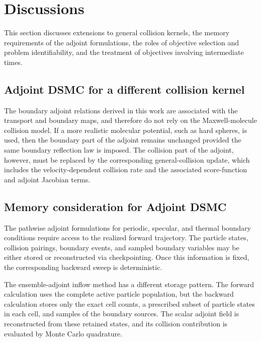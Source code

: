 \documentclass[12pt,nopreprintline]{elsarticle}
\begin{document}
{

\section{Discussions}\label{sec:discussion}

This section discusses extensions to general collision kernels, the memory requirements of the adjoint formulations, the roles of objective selection and problem identifiability, and the treatment of objectives involving intermediate times.

\subsection{Adjoint DSMC for a different collision kernel} The boundary adjoint relations derived in this work are associated with the transport and boundary maps, and therefore do not rely on the Maxwell-molecule collision model. If a more realistic molecular potential, such as hard spheres, is used, then the boundary part of the adjoint remains unchanged provided the same boundary reflection law is imposed. The collision part of the adjoint, however, must be replaced by the corresponding general-collision update, which includes the velocity-dependent collision rate and the associated score-function and adjoint Jacobian terms.

\subsection{Memory consideration for Adjoint DSMC}

The pathwise adjoint formulations for periodic, specular, and thermal boundary conditions require access to the realized forward trajectory. The particle states, collision pairings, boundary events, and sampled boundary variables may be either stored or reconstructed via checkpointing. Once this information is fixed, the corresponding backward sweep is deterministic.

The ensemble-adjoint inflow method has a different storage pattern. The forward calculation uses the complete active particle population, but the backward calculation stores only the exact cell counts, a prescribed subset of particle states in each cell, and samples of the boundary sources. The scalar adjoint field is reconstructed from these retained states, and its collision contribution is evaluated by Monte Carlo quadrature. 

}
\end{document}
